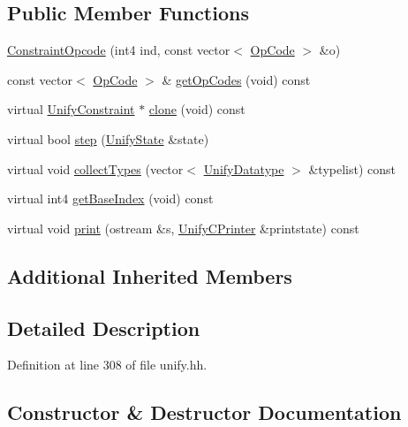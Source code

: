 \subsection*{Public Member Functions}
\begin{DoxyCompactItemize}
\item 
\mbox{\hyperlink{class_constraint_opcode_a2debc0873db698c985ac75f422bf35f0}{Constraint\+Opcode}} (int4 ind, const vector$<$ \mbox{\hyperlink{opcodes_8hh_abeb7dfb0e9e2b3114e240a405d046ea7}{Op\+Code}} $>$ \&o)
\item 
const vector$<$ \mbox{\hyperlink{opcodes_8hh_abeb7dfb0e9e2b3114e240a405d046ea7}{Op\+Code}} $>$ \& \mbox{\hyperlink{class_constraint_opcode_a8fc20418a32489ad2485e01a853ea98b}{get\+Op\+Codes}} (void) const
\item 
virtual \mbox{\hyperlink{class_unify_constraint}{Unify\+Constraint}} $\ast$ \mbox{\hyperlink{class_constraint_opcode_aaa3bc0e6cc446941be344459b962e2b6}{clone}} (void) const
\item 
virtual bool \mbox{\hyperlink{class_constraint_opcode_adab0b976a316fe14cfd1f6169a2d6fe3}{step}} (\mbox{\hyperlink{class_unify_state}{Unify\+State}} \&state)
\item 
virtual void \mbox{\hyperlink{class_constraint_opcode_a99d5a920f6260d33be99fd2b2ea40bc1}{collect\+Types}} (vector$<$ \mbox{\hyperlink{class_unify_datatype}{Unify\+Datatype}} $>$ \&typelist) const
\item 
virtual int4 \mbox{\hyperlink{class_constraint_opcode_a8216f50f387c229d3c7bbf50ce717aed}{get\+Base\+Index}} (void) const
\item 
virtual void \mbox{\hyperlink{class_constraint_opcode_a4ae4b3306f7bf7fa9fb55bd142a7cf47}{print}} (ostream \&s, \mbox{\hyperlink{class_unify_c_printer}{Unify\+C\+Printer}} \&printstate) const
\end{DoxyCompactItemize}
\subsection*{Additional Inherited Members}


\subsection{Detailed Description}


Definition at line 308 of file unify.\+hh.



\subsection{Constructor \& Destructor Documentation}
\mbox{\label{class_constraint_opcode_a2debc0873db698c985ac75f422bf35f0}} 
